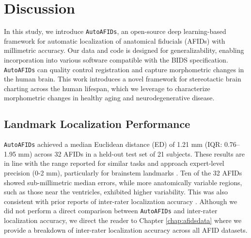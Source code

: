 \section{Discussion}
In this study, we introduce \texttt{AutoAFIDs}, an open-source deep learning-based framework for automatic localization of anatomical fiducials (AFIDs) with millimetric accuracy. Our data and code is designed for generalizability, enabling incorporation into various software compatible with the BIDS specification. \texttt{AutoAFIDs} can quality control registration and capture morphometric changes in the human brain. This work introduces a novel framework for stereotactic brain charting across the human lifespan, which we leverage to characterize morphometric changes in healthy aging and neurodegenerative disease.

\subsection{Landmark Localization Performance}

\texttt{AutoAFIDs} achieved a median Euclidean distance (ED) of 1.21 mm (IQR: 0.76–1.95 mm) across 32 AFIDs in a held-out test set of 21 subjects. These results are in line with the range reported for similar tasks \cite{Ertl2025-wu, Salari2024-iu, Edwards2021-su} and approach expert-level precision (0-2 mm), particularly for brainstem landmarks \cite{Abbass2022-lf}. Ten of the 32 AFIDs showed sub-millimetric median errors, while more anatomically variable regions, such as those near the ventricles, exhibited higher variability. This was also consistent with prior reports of inter-rater localization accuracy \cite{Lau2019-eh, Abbass2022-lf}. Although we did not perform a direct comparison between \texttt{AutoAFIDs} and inter-rater localization accuracy, we direct the reader to Chapter \ref{chap:afidsdata} where we provide a breakdown of inter-rater localization accuracy across all AFID datasets. 

